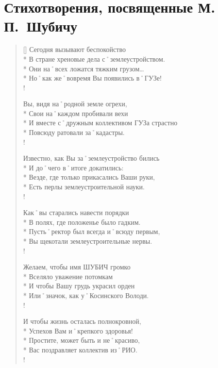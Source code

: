 ﻿\section{Стихотворения, посвященные М.\,П.~Шубичу}

\settowidth{\versewidth}{В полях, где положенье было гадким.}		%
\begin{verse}[\versewidth]
Сегодня вызывают беспокойство\\*
В стране хреновые дела с˚землеустройством.\\*
Они на˚всех ложатся тяжким грузом…\\* 
Но˚как же˚вовремя Вы появились в˚ГУЗе!\\!

\vin Вы, видя на˚родной земле огрехи,\\*
\vin Свои на˚каждом пробивали вехи \\*
\vin И вместе с˚дружным коллективом ГУЗа страстно \\*
\vin Повсюду ратовали за˚кадастры.\\!

Известно, как Вы за˚землеустройство бились \\*
И до˚чего в˚итоге докатились:\\*
Везде, где только прикасались Ваши руки,\\*
Есть перлы землеустроительной науки.\\!

\vin Как˚вы старались навести порядки \\*
\vin В полях, где положенье было гадким.\\*
\vin Пусть˚ректор был всегда и˚всюду первым,\\*
\vin Вы щекотали землеустроительные нервы.\\!

Желаем, чтобы имя ШУБИЧ громко \\*
Вселяло уважение потомкам \\*
И чтобы Вашу грудь украсил орден \\*
Или˚значок, как у˚Косинского Володи.\\!

\vin И чтобы жизнь осталась полнокровной,\\*
\vin Успехов Вам и˚крепкого здоровья!\\*
\vin Простите, может быть и не˚красиво,\\*
\vin Вас поздравляет коллектив из˚РИО.  \\!

\end{verse}


